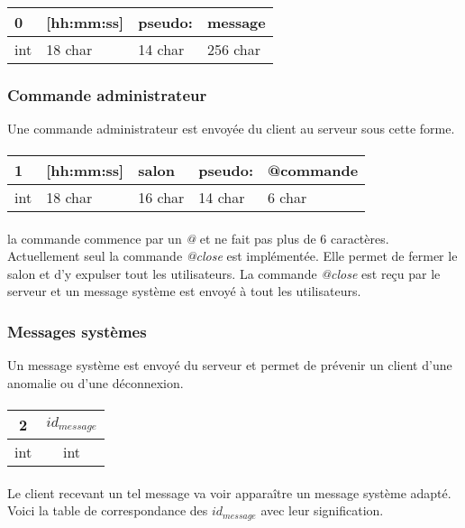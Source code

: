 \documentclass[a4paper, 12pt]{article}
\begin{document}
\paragraph{}
 \begin{tabular}{|p{0.5cm}|p{2cm}|p{1.5cm}|p{5cm}| }
  \hline			
    0 & [hh:mm:ss] & pseudo: & message \\
  \hline		
    int & 18 char & 14 char & 256 char \\
  \hline  
  \end{tabular}
\subsubsection{Commande administrateur}
Une commande administrateur est envoyée du client au serveur sous cette forme.
\paragraph{}
\begin{tabular}{|p{0.5cm}|p{2cm}|p{1.6cm}|p{1.5cm}|p{5cm}| }
 \hline			
  1 & [hh:mm:ss] & salon & pseudo: & @commande \\
 \hline		
  int & 18 char & 16 char & 14 char & 6 char \\
 \hline  
 \end{tabular}
 \paragraph{}
la commande commence par un \emph{@} et ne fait pas plus de 6 caractères.
Actuellement seul la commande \emph{@close} est implémentée. Elle permet de fermer le salon et d'y expulser tout les utilisateurs.
La commande \emph{@close} est reçu par le serveur et un message système est envoyé à tout les utilisateurs.
\subsubsection{Messages systèmes}
Un message système est envoyé du serveur et permet de prévenir un client d'une anomalie ou d'une déconnexion.
\paragraph{}
\begin{tabular}{|c|c|}
 \hline			
   2 & $id_{message}$\\
 \hline		
   int & int \\
 \hline  
 \end{tabular}
\paragraph{}
Le client recevant un tel message va voir apparaître un message système adapté.
Voici la table de correspondance des $id_{message}$ avec leur signification.
\end{document}
